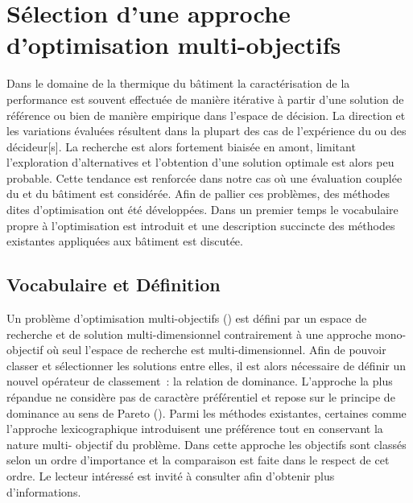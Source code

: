 \section{Sélection d’une approche d’optimisation multi-objectifs} %
\label{sec:selection_d_une_approche_d_optimisation_multi_objectif}
Dans le domaine de la thermique du bâtiment la caractérisation de la performance est
souvent effectuée de manière itérative à partir d’une solution de référence ou bien de
manière empirique dans l’espace de décision. La direction et les variations évaluées
résultent dans la plupart des cas de l’expérience du ou des décideur[s]. La recherche est
alors fortement biaisée en amont, limitant l’exploration d’alternatives et l’obtention
d’une solution optimale est alors peu probable. Cette tendance est renforcée dans notre
cas où une évaluation couplée du  et du bâtiment est considérée. Afin de pallier
ces problèmes, des méthodes dites d’optimisation ont été développées. Dans un premier
temps le vocabulaire propre à l’optimisation est introduit et une description succincte
des méthodes existantes appliquées aux bâtiment est discutée.



\subsection{Vocabulaire et Définition} %
\label{sub:vocabulaire_et_definition}
Un problème d’optimisation multi-objectifs ()
est défini par un espace de recherche et de solution multi-dimensionnel contrairement à
une approche mono-objectif où seul l’espace de recherche est multi-dimensionnel. Afin de
pouvoir classer et sélectionner les solutions entre elles, il est alors nécessaire de
définir un nouvel opérateur de classement~: la relation de dominance. L’approche la plus
répandue ne considère pas de caractère préférentiel et repose sur le principe de dominance
au sens de Pareto (). Parmi les méthodes
existantes, certaines comme l’approche lexicographique introduisent une préférence tout en
conservant la nature multi- objectif du problème. Dans cette
approche les objectifs sont classés selon un ordre d’importance et la comparaison est
faite dans le respect de cet ordre. Le lecteur intéressé est invité à consulter
\textcite{Collette2002} afin d’obtenir plus d’informations.


